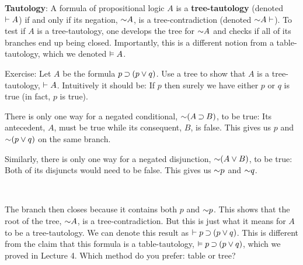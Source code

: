 \documentclass[options]{philosophersimprint}
\begin{document}
\textbf{Tautology}: A formula of propositional logic $A$ is a \textbf{tree-tautology} (denoted $\vdash A$) if and only if its negation, $\mathord{\sim} A$, is a tree-contradiction (denoted $\mathord{\sim} A\vdash$). To test if $A$ is a tree-tautology, one develops the tree for $\mathord{\sim} A$ and checks if all of its branches end up being closed. Importantly, this is a different notion from a table-tautology, which we denoted $\vDash A$.

Exercise: Let $A$ be the formula $p\mathbin{\supset} (p\mathbin{\vee} q)$. Use a tree to show that $A$ is a tree-tautology, $\vdash A$. Intuitively it should be: If $p$ then surely we have either $p$ or $q$ is true (in fact, $p$ is true).

\begin{center}
\begin{minipage}[t]{0.3\textwidth}
There is only one way for a negated conditional, $\mathord{\sim}(A\mathbin{\supset} B)$, to be true: Its antecedent, $A$, must be true while its consequent, $B$, is false. This gives us $p$ and $\mathord{\sim} (p \mathbin{\vee} q)$ on the same branch.
\vspace{1em}

Similarly, there is only one way for a negated disjunction, $\mathord{\sim}(A\mathbin{\vee} B)$, to be true: Both of its disjuncts would need to be false. This gives us $\mathord{\sim} p$ and $\mathord{\sim} q$.
\end{minipage}
\hfill
\begin{minipage}[t]{0.15\textwidth}
\begin{center}
\vspace{-2em}
\qquad\qquad\qquad{}\\
\end{center}
\end{minipage}
\end{center}

The branch then closes because it contains both $p$ and $\mathord{\sim} p$. This shows that the root of the tree, $\mathord{\sim} A$, is a tree-contradiction. But this is just what it means for $A$ to be a tree-tautology. We can denote this result as $\vdash p \mathbin{\supset} (p \mathbin{\vee} q)$. This is different from the claim that this formula is a table-tautology, $\vDash p \mathbin{\supset} (p \mathbin{\vee} q)$, which we proved in Lecture 4. Which method do you prefer: table or tree?
\end{document}

